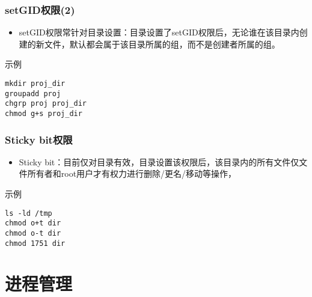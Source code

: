 \documentclass[xcolor=svgnames,presentation]{beamer}
\begin{document}
\begin{frame}[fragile]
\frametitle{setGID权限(2)}
\label{sec-2-3-4}
\begin{itemize}

\item setGID权限常针对目录设置：目录设置了setGID权限后，无论谁在该目录内创建的新文件，默认都会属于该目录所属的组，而不是创建者所属的组。
\label{sec-2-3-4-1}%
\end{itemize} %
\begin{exampleblock}{示例}
\label{sec-2-3-4-2}


\begin{verbatim}
mkdir proj_dir
groupadd proj
chgrp proj proj_dir
chmod g+s proj_dir
\end{verbatim}
\end{exampleblock}
\end{frame}
\begin{frame}[fragile]
\frametitle{Sticky bit权限}
\label{sec-2-3-5}
\begin{itemize}

\item Sticky bit：目前仅对目录有效，目录设置该权限后，该目录内的所有文件仅文件所有者和root用户才有权力进行删除/更名/移动等操作，
\label{sec-2-3-5-1}%
\end{itemize} %
\begin{exampleblock}{示例}
\label{sec-2-3-5-2}


\begin{verbatim}
ls -ld /tmp
chmod o+t dir
chmod o-t dir
chmod 1751 dir
\end{verbatim}
\end{exampleblock}
\end{frame}
\section{进程管理}
\label{sec-3}
\end{document}
